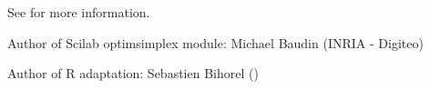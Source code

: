 %
\begin{Details}\relax

See  for more
information.
\end{Details}
%
\begin{Author}\relax
Author of Scilab optimsimplex module: Michael Baudin (INRIA - Digiteo)

Author of R adaptation: Sebastien Bihorel ()
\end{Author}
